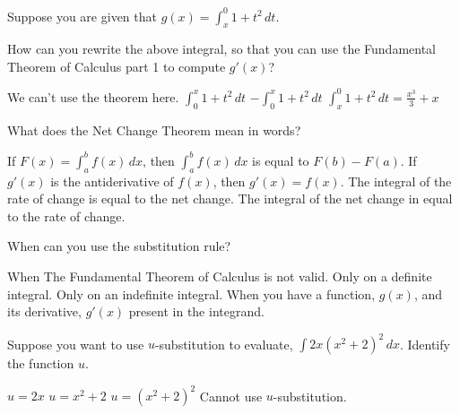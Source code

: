 \documentclass[addpoints, 12pt]{exam}%
\newcommand{\spc}{\vspace*{0.5cm}}
\begin{document}
\begin{questions}
\spc

\question[1]

Suppose you are given that $g(x) = \displaystyle\int_{x}^{0} 1 + t^2\,dt$. 

How can you rewrite the above integral, so that you can use the Fundamental Theorem of Calculus part 1 to compute $g'(x)$?

\begin{multicols}{2}
\begin{choices}
\choice We can't use the theorem here.
\choice $\int_{0}^{x} 1 + t^2\,dt$
\CorrectChoice $-\int_{0}^{x} 1 + t^2\,dt$
\choice $\int_{x}^{0} 1 + t^2\,dt = \frac{x^3}{3} + x$
\end{choices}
\end{multicols}

\spc

\question[1]

What does the Net Change Theorem mean in words?

\begin{multicols}{2}
\begin{choices}
\choice If $F(x) = \int_{a}^{b} f(x) \,dx$, then $\int_{a}^{b} f(x) \,dx$ is equal to $F(b) - F(a)$.
\choice If $g'(x)$ is the antiderivative of $f(x)$, then $g'(x) = f(x)$.
\CorrectChoice The integral of the rate of change is equal to the net change.
\choice The integral of the net change in equal to the rate of change.
\end{choices}
\end{multicols}

\newpage

\question[1]

When can you use the substitution rule?

\begin{multicols}{2}
\begin{choices}
\choice When The Fundamental Theorem of Calculus is not valid.
\choice Only on a definite integral.
\choice Only on an indefinite integral.
\CorrectChoice When you have a function, $g(x)$, and its derivative, $g'(x)$ present in the integrand.
\end{choices}
\end{multicols}

\spc

\question[1]

Suppose you want to use $u$-substitution to evaluate, $\displaystyle \int 2x(x^2 + 2)^2\,dx$. Identify the function $u$.

\begin{multicols}{2}
\begin{choices}
\choice $u = 2x$
\CorrectChoice $u = x^2 + 2$
\choice $u = (x^2 + 2)^2$
\choice Cannot use $u$-substitution.
\end{choices}
\end{multicols}


\end{questions}
\end{document}
